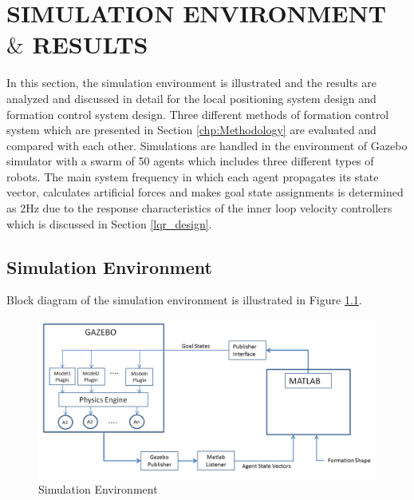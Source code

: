 

\chapter{SIMULATION ENVIRONMENT $\&$ RESULTS}
\label{chp:simulation}













In this section, the simulation environment is illustrated and the results are analyzed and discussed in detail for the local positioning system design and formation control system design. Three different methods of formation control system which are presented in Section \ref{chp:Methodology} are evaluated and compared with each other. Simulations are handled in the environment of Gazebo simulator with a swarm of 50 agents which includes three different types of robots. The main system frequency in which each agent propagates its state vector, calculates artificial forces and makes goal state assignments is determined as 2Hz due to the response characteristics of the inner loop velocity controllers which is discussed in Section \ref{lqr_design}. 

\newpage
\section{Simulation Environment}
Block diagram of the simulation environment is illustrated in Figure \ref{simulation_env_ref}.

\begin{figure}[H]
\caption{Simulation Environment} \label{simulation_env_ref}
\centering
\includegraphics[scale = 0.45]{environment}
\end{figure}
    
